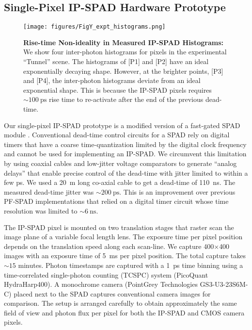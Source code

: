 \subsection{Single-Pixel IP-SPAD Hardware Prototype}
\begin{figure}[!ht]
  \centering
  \texttt{[image: figures/FigY\_expt\_histograms.png]}
\caption{\textbf{Rise-time Non-ideality in Measured IP-SPAD Histograms:} We show
four inter-photon histograms for pixels in the experimental ``Tunnel'' scene.
The histograms of [P1] and [P2] have an ideal exponentially decaying shape.
However, at the brighter points, [P3] and [P4], the inter-photon histograms
deviate from an ideal exponential shape. This is because the IP-SPAD pixels requires
$\sim \SI{100}{\ps}$ rise time to re-activate after the end of the previous dead-time.
  \vspace{-0.25in}
\label{fig:exp_hists}}
\end{figure}


Our single-pixel IP-SPAD prototype is a modified version of a fast-gated SPAD
module \cite{Buttafava2014}. Conventional dead-time control circuits for a SPAD
rely on digital timers that have a coarse time-quantization limited by the
digital clock frequency and cannot be used for implementing an IP-SPAD. We
circumvent this limitation by using coaxial cables and low-jitter voltage
comparators to generate ``analog delays'' that enable precise control of the
dead-time with jitter limited to within a few \si{\ps}. We used a \SI{20}{\m}
long co-axial cable to get a dead-time of \SI{110}{\ns}. The measured dead-time
jitter was $\sim\SI{200}{\ps}$. This is an improvement over previous PF-SPAD
implementations \cite{ingle2019high} that relied on a digital timer circuit
whose time resolution was limited to $\sim\SI{6}{\ns}$.

The IP-SPAD pixel is mounted on two translation stages that raster scan the
image plane of a variable focal length lens. The exposure time per pixel
position depends on the translation speed along each scan-line.  We capture
400$\times$400 images with an exposure time of \num{5}~\si{\ms} per pixel
position. The total capture takes $\sim\!\!\!15$ minutes. Photon timestamps are
captured with a \SI{1}{\ps} time binning using a time-correlated single-photon
counting (TCSPC) system (PicoQuant HydraHarp400). A monochrome camera
(PointGrey Technologies GS3-U3-23S6M-C) placed next to the SPAD captures
conventional camera images for comparison.  The setup is arranged carefully to
obtain approximately the same field of view and photon flux per pixel for both
the IP-SPAD and CMOS camera pixels.

